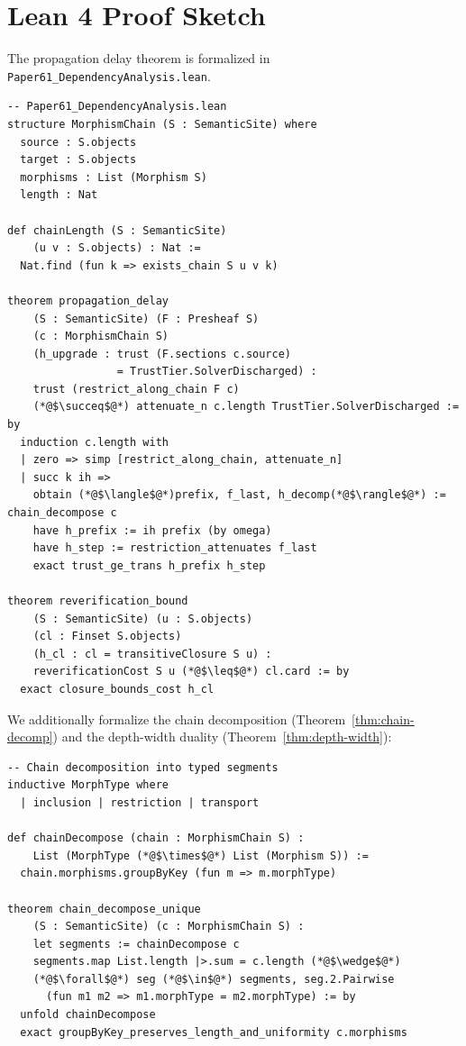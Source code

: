 \documentclass[11pt]{article}
\begin{document}
\section{Lean 4 Proof Sketch}\label{sec:lean-proof}

The propagation delay theorem is formalized in
\texttt{Paper61\_DependencyAnalysis.lean}.

\begin{lstlisting}[style=jugeo-python,title=Lean 4 Formalization Sketch]
-- Paper61_DependencyAnalysis.lean
structure MorphismChain (S : SemanticSite) where
  source : S.objects
  target : S.objects
  morphisms : List (Morphism S)
  length : Nat

def chainLength (S : SemanticSite)
    (u v : S.objects) : Nat :=
  Nat.find (fun k => exists_chain S u v k)

theorem propagation_delay
    (S : SemanticSite) (F : Presheaf S)
    (c : MorphismChain S)
    (h_upgrade : trust (F.sections c.source)
                 = TrustTier.SolverDischarged) :
    trust (restrict_along_chain F c)
    (*@$\succeq$@*) attenuate_n c.length TrustTier.SolverDischarged := by
  induction c.length with
  | zero => simp [restrict_along_chain, attenuate_n]
  | succ k ih =>
    obtain (*@$\langle$@*)prefix, f_last, h_decomp(*@$\rangle$@*) := chain_decompose c
    have h_prefix := ih prefix (by omega)
    have h_step := restriction_attenuates f_last
    exact trust_ge_trans h_prefix h_step

theorem reverification_bound
    (S : SemanticSite) (u : S.objects)
    (cl : Finset S.objects)
    (h_cl : cl = transitiveClosure S u) :
    reverificationCost S u (*@$\leq$@*) cl.card := by
  exact closure_bounds_cost h_cl
\end{lstlisting}

We additionally formalize the chain decomposition
(Theorem~\ref{thm:chain-decomp}) and the depth-width duality
(Theorem~\ref{thm:depth-width}):

\begin{lstlisting}[style=jugeo-python,title=Chain Decomposition Formalization]
-- Chain decomposition into typed segments
inductive MorphType where
  | inclusion | restriction | transport

def chainDecompose (chain : MorphismChain S) :
    List (MorphType (*@$\times$@*) List (Morphism S)) :=
  chain.morphisms.groupByKey (fun m => m.morphType)

theorem chain_decompose_unique
    (S : SemanticSite) (c : MorphismChain S) :
    let segments := chainDecompose c
    segments.map List.length |>.sum = c.length (*@$\wedge$@*)
    (*@$\forall$@*) seg (*@$\in$@*) segments, seg.2.Pairwise
      (fun m1 m2 => m1.morphType = m2.morphType) := by
  unfold chainDecompose
  exact groupByKey_preserves_length_and_uniformity c.morphisms
\end{lstlisting}
\end{document}
